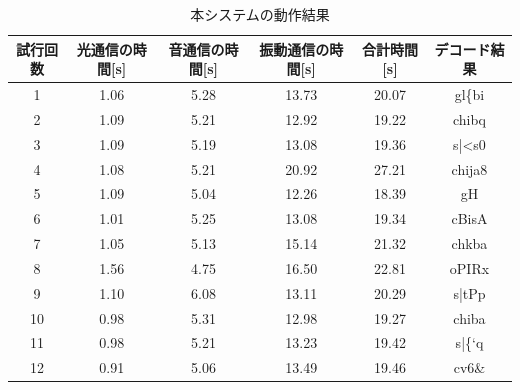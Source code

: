 \begin{table}[htbp]
    \centering
    \caption{本システムの動作結果}
    \label{table:result}
    \begin{tabular}{|c|c|c|c|c|c|} \hline
        試行回数 &光通信の時間[s]  &音通信の時間[s] &振動通信の時間[s] &合計時間[s] &デコード結果  \\ \hline
        1 &1.06   &5.28  &13.73  &20.07 &gl\{bi  \\ \hline
        2 &1.09   &5.21  &12.92  &19.22 &chibq  \\ \hline
        3 &1.09   &5.19  &13.08  &19.36 &s|<s0  \\ \hline
        4 &1.08   &5.21  &20.92  &27.21 &chija8 \\ \hline
        5 &1.09   &5.04  &12.26  &18.39 &gH     \\ \hline
        6 &1.01   &5.25  &13.08  &19.34 &cBisA  \\ \hline
        7 &1.05   &5.13  &15.14  &21.32 &chkba  \\ \hline
        8 &1.56   &4.75  &16.50  &22.81 &oPIRx  \\ \hline
        9 &1.10   &6.08  &13.11  &20.29 &s|tPp  \\ \hline
        10 &0.98  &5.31  &12.98  &19.27 &chiba  \\ \hline
        11 &0.98  &5.21  &13.23  &19.42 &s|\{`q  \\ \hline
        12 &0.91  &5.06  &13.49  &19.46 &cv6\&  \\ \hline
    \end{tabular}
\end{table}


